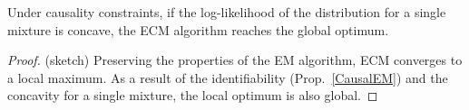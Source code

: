 \begin{corollary}
\label{CausalEM2} Under causality constraints, if the log-likelihood of the distribution for a single mixture is concave, the ECM algorithm reaches the global optimum.
\end{corollary}
\begin{proof} (sketch)
    Preserving the properties of the EM algorithm, ECM converges to a local maximum. As a result of the identifiability (Prop.~\ref{CausalEM}) and the concavity for a single mixture, the local optimum is also global.
\end{proof}


